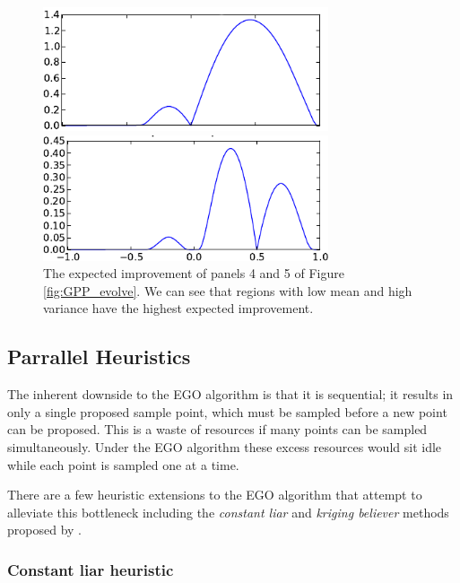 \documentclass[phd,tocprelim]{cornell}
\begin{document}
\begin{figure}[hpt]
 	\centerline{\includegraphics[width=0.75\textwidth]{figures/EPI/GPP_example_EI4.png}}
    \centerline{\includegraphics[width=0.75\textwidth]{figures/EPI/GPP_example_EI.png}}
    \caption[Evolution of expected improvement of a GPP]{The expected improvement of panels 4 and 5 of Figure \ref{fig:GPP_evolve}. We can see that regions with low mean and high variance have the highest expected improvement.}
 	\label{fig:GPP_EI_evolve}
\end{figure}

\subsection{Parrallel Heuristics}

The inherent downside to the EGO algorithm is that it is sequential; it results in only a single proposed sample point, which must be sampled before a new point can be proposed. This is a waste of resources if many points can be sampled simultaneously. Under the EGO algorithm these excess resources would sit idle while each point is sampled one at a time.

There are a few heuristic extensions to the EGO algorithm that attempt to alleviate this bottleneck including the {\it constant liar} and {\it kriging believer} methods proposed by \cite{Ginsbourger2008}.

\subsubsection{Constant liar heuristic}
\end{document}
